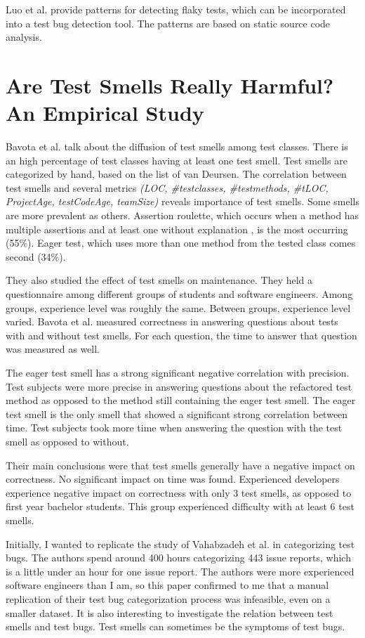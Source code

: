 \documentclass{uvamscse}
\newcommand{\Atestbugs}{Vahabzadeh et al.}
\newcommand{\Aflaky}{Luo et al.}
\begin{document}
\Aflaky{} provide patterns for detecting flaky tests, which can be incorporated into a test bug detection tool. The patterns are based on static source code analysis.

\section{Are Test Smells Really Harmful? An Empirical Study}
Bavota et al. \cite{bavota2012empirical} talk about the diffusion of test smells among test classes. There is an high percentage of test classes having at least one test smell. Test smells are categorized by hand, based on the list of van Deursen. The correlation between test smells and several metrics \textit{(LOC, \#testclasses, \#testmethods, \#tLOC, ProjectAge, testCodeAge, teamSize) }reveals importance of test smells. Some smells are more prevalent as others. Assertion roulette, which occurs when a method has multiple assertions and at least one without explanation , is the most occurring (55\%). Eager test, which uses more than one method from the tested class comes second (34\%). 

They also studied the effect of test smells on maintenance. They held a questionnaire among different groups of students and software engineers. Among groups, experience level was roughly the same. Between groups, experience level varied. Bavota et al.  measured correctness in answering questions about tests with and without test smells. For each question, the time to answer that question was measured as well. 

The eager test smell has a strong significant negative correlation with precision. Test subjects were more precise in answering questions about the refactored test method as opposed to the method still containing the eager test smell. The eager test smell is the only smell that showed a significant strong correlation between time. Test subjects took more time when answering the question with the test smell as opposed to without.

Their main conclusions were that test smells generally have a negative impact on correctness. No significant impact on time was found. Experienced developers experience negative impact on correctness with only 3 test smells, as opposed to first year bachelor students. This group experienced difficulty with at least 6 test smells.

Initially, I wanted to replicate the study of \Atestbugs{} in categorizing test bugs. The authors spend around 400 hours categorizing 443 issue reports, which is a little under an hour for one issue report. The authors were more experienced software engineers than I am, so this paper confirmed to me that a manual replication of their test bug categorization process was infeasible, even on a smaller dataset. It is also interesting to investigate the relation between test smells and test bugs. Test smells can sometimes be the symptoms of test bugs.  
\end{document}
